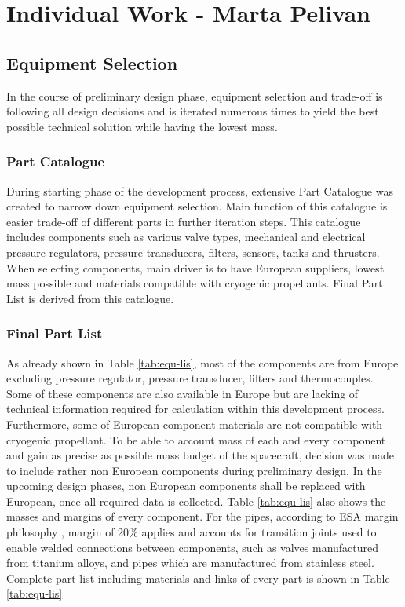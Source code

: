 \section{Individual Work - Marta Pelivan}

\subsection{Equipment Selection}

In the course of preliminary design phase, equipment selection and trade-off is following all design decisions and is iterated numerous times to yield the best possible technical solution while having the lowest mass.

\subsubsection{Part Catalogue}

During starting phase of the development process, extensive Part Catalogue was created to narrow down equipment selection. Main function of this catalogue is easier trade-off of different parts in further iteration steps. This catalogue includes components such as various valve types, mechanical and electrical pressure regulators, pressure transducers, filters, sensors, tanks and thrusters. When selecting components, main driver is to have European suppliers, lowest mass possible and materials compatible with cryogenic propellants. Final Part List is derived from this catalogue.

\subsubsection{Final Part List}

As already shown in Table \ref{tab:equ-lis}, most of the components are from Europe excluding pressure regulator, pressure transducer, filters and thermocouples. Some of these components are also available in Europe but are lacking of technical information required for calculation within this development process. Furthermore, some of European component materials are not compatible with cryogenic propellant. To be able to account mass of each and every component and gain as precise as possible mass budget of the spacecraft, decision was made to include rather non European components during preliminary design. In the upcoming design phases, non European components shall be replaced with European, once all required data is collected. Table \ref{tab:equ-lis} also shows the masses and margins of every component. For the pipes, according to ESA margin philosophy \cite{ESA.2012}, margin of 20\% applies and accounts for transition joints used to enable welded connections between components, such as valves manufactured from titanium alloys, and pipes which are manufactured from stainless steel. Complete part list including materials and links of every part is shown in Table \ref{tab:equ-lis}

